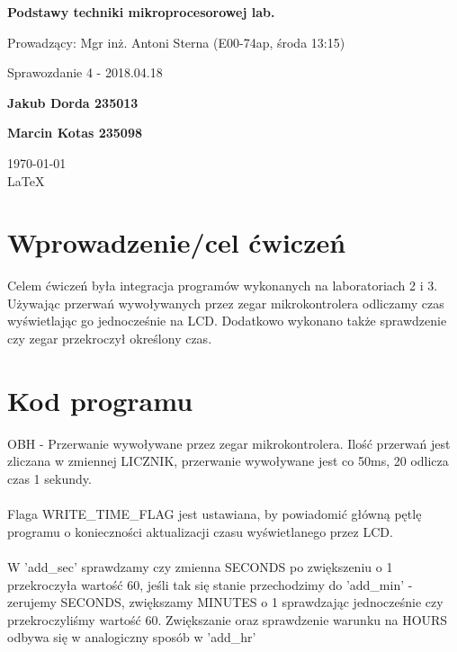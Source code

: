 \documentclass[12pt,a4paper]{article}
\begin{document}
	
	\begin{titlepage}
		
		\centering
		{\huge\bfseries Podstawy techniki mikroprocesorowej lab.\par}
		
		\vspace{0.5cm}
		Prowadzący: Mgr inż. Antoni Sterna (E00-74ap, środa 13:15) \\
	
		\vspace{1.1cm}
		{\Large Sprawozdanie 4 - 2018.04.18\par}
		\vfill
		
		{\large\bfseries Jakub Dorda 235013\par}
		{\large\bfseries Marcin Kotas 235098\par}
		
		\vspace{1cm}
		\today \\ \LaTeX
		
		\restoregeometry
	\end{titlepage}


	\section{Wprowadzenie/cel ćwiczeń}
		Celem ćwiczeń była integracja programów wykonanych na laboratoriach 2 i 3. Używając przerwań wywoływanych
		przez zegar mikrokontrolera odliczamy czas wyświetlając go jednocześnie na LCD. Dodatkowo wykonano także
		sprawdzenie czy zegar przekroczył określony czas.
		
	\section{Kod programu}
		\begin{minipage}{.5\textwidth}
			
		\end{minipage}%
		\begin{minipage}{.5\textwidth}
			OBH - Przerwanie wywoływane przez zegar mikrokontrolera. Ilość przerwań jest zliczana w zmiennej
			LICZNIK, przerwanie wywoływane jest co 50ms, 20 odlicza czas 1 sekundy.\\\\
			Flaga WRITE\_TIME\_FLAG jest ustawiana, by powiadomić główną pętlę programu o konieczności aktualizacji
			czasu wyświetlanego przez LCD.\\\\
			W 'add\_sec' sprawdzamy czy zmienna SECONDS po zwiększeniu o 1 przekroczyła wartość 60,
			jeśli tak się stanie przechodzimy do 'add\_min' - zerujemy SECONDS, zwiększamy MINUTES o 1 sprawdzając
			jednocześnie czy przekroczyliśmy wartość 60. Zwiększanie oraz sprawdzenie warunku na HOURS odbywa się
			w analogiczny sposób w 'add\_hr'\\\\
		\end{minipage}
		
\end{document}
